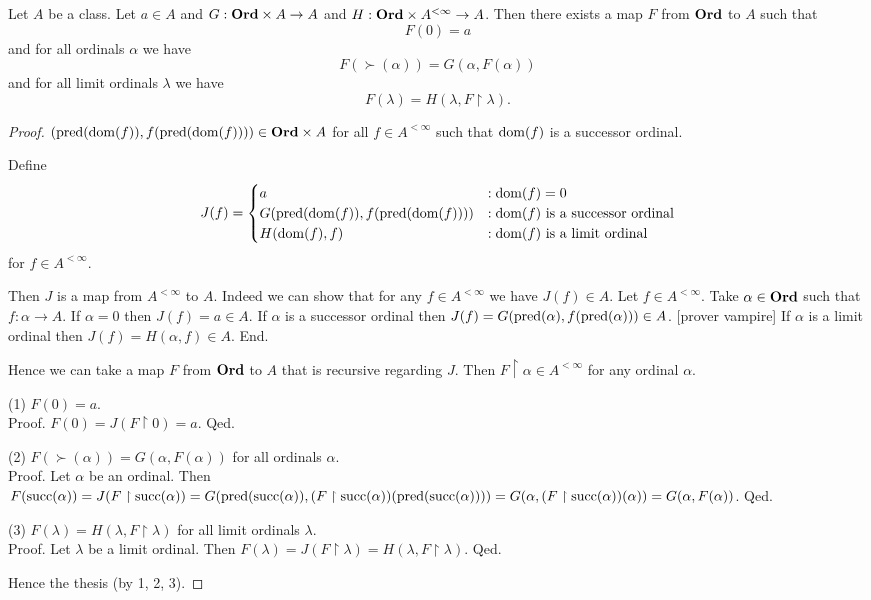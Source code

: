 \documentclass{article}
\begin{document}
  \begin{forthel}
    \begin{corollary*}\label{recursion}
      Let $A$ be a class.
      Let $a \in A$ and $G : \textbf{Ord} \times A \to A$ and $H : \textbf{Ord} \times A^{< \infty} \to A$.
      Then there exists a map $F$ from $\textbf{Ord}$ to $A$ such that
      \[ F(0) = a \]
      and for all ordinals $\alpha$ we have
      \[ F(\succ(\alpha)) = G(\alpha, F(\alpha)) \]
      and for all limit ordinals $\lambda$ we have
      \[ F(\lambda) = H(\lambda, F \restriction \lambda). \]
    \end{corollary*}
    \begin{proof}
      $(\textrm{pred}(\operatorname{dom}(f)), f(\textrm{pred}(\operatorname{dom}(f)))) \in \textbf{Ord} \times A$ for all $f \in A^{< \infty}$ such that $\operatorname{dom}(f)$ is a successor ordinal.

      Define  \[ J(f) =
        \begin{cases}
          a
          & : \operatorname{dom}(f) = 0
          \\
          G(\textrm{pred}(\operatorname{dom}(f)), f(\textrm{pred}(\operatorname{dom}(f))))
          & : \text{$\operatorname{dom}(f)$ is a successor ordinal}
          \\
          H(\operatorname{dom}(f), f)
          & : \text{$\operatorname{dom}(f)$ is a limit ordinal}
        \end{cases} \]
      for $f \in A^{< \infty}$.

      Then $J$ is a map from $A^{< \infty}$ to $A$.
      Indeed we can show that for any $f \in A^{< \infty}$ we have $J(f) \in A$.
        Let $f \in A^{< \infty}$.
        Take $\alpha \in \textbf{Ord}$ such that $f : \alpha \to A$.
        If $\alpha = 0$ then $J(f) = a \in A$.
        If $\alpha$ is a successor ordinal then $J(f) =
        G(\textrm{pred}(\alpha), f(\textrm{pred}(\alpha))) \in A$.
        [prover vampire]
        If $\alpha$ is a limit ordinal then $J(f) = H(\alpha, f) \in A$.
      End.

      Hence we can take a map $F$ from $\textbf{Ord}$ to $A$ that is recursive regarding $J$.
      Then $F \restriction \alpha \in A^{< \infty}$ for any ordinal $\alpha$.

      (1) $F(0) = a$. \\
      Proof.
        $F(0)
          = J(F \restriction 0)
          = a$.
      Qed.

      (2) $F(\succ(\alpha)) = G(\alpha, F(\alpha))$ for all ordinals $\alpha$. \\
      Proof.
        Let $\alpha$ be an ordinal.
        Then $F(\textrm{succ}(\alpha))
          = J(F \restriction \textrm{succ}(\alpha))
          = G(\textrm{pred}(\textrm{succ}(\alpha)), (F \restriction \textrm{succ}(\alpha))(\textrm{pred}(\textrm{succ}(\alpha))))
          = G(\alpha, (F \restriction \textrm{succ}(\alpha))(\alpha))
          = G(\alpha, F(\alpha))$.
      Qed.

      (3) $F(\lambda) = H(\lambda, F \restriction \lambda)$ for all limit ordinals $\lambda$. \\
      Proof.
        Let $\lambda$ be a limit ordinal.
        Then $F(\lambda)
          = J(F \restriction \lambda)
          = H(\lambda, F \restriction \lambda)$.
      Qed.

      Hence the thesis (by 1, 2, 3).
    \end{proof}
  \end{forthel}

  \printbibliography
\end{document}
